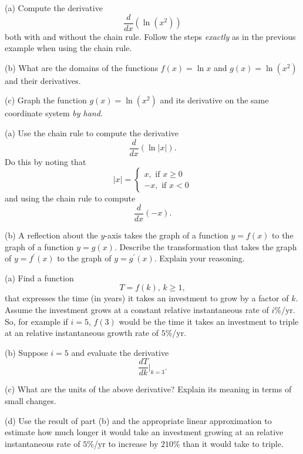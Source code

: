 \documentclass{ximera}
\begin{document}
\begin{question}  \label{Qdfbb44443243}
(a) Compute the derivative 
\[
       \frac{d}{dx} \left( \ln(x^2)  \right)
\]
both with and without the chain rule. Follow the steps \emph{exactly} as in the previous example when using the chain rule.

(b) What are the domains of the functions $f(x)=\ln x$ and $g(x) = \ln (x^2)$ and their derivatives.

(c) Graph the function $g(x) = \ln (x^2)$ and its derivative on the same coordinate system \emph{by hand}.

\end{question}

\begin{question}  \label{Qdefrgbhrdtgr}
(a) Use the chain rule to compute the derivative
\[
   \frac{d}{dx} \left( \ln |x| \right) .
\]
Do this by noting that
\[
|x| = 
\begin{cases}
    x , \text{ if } x\geq 0 \\
   -x ,  \text{ if } x<0
\end{cases}
\]
and using the chain rule to compute 
\[
  \frac{d}{dx}  \left(  -x \right).
\]

(b) A reflection about the $y$-axis takes the graph of a function $y=f(x)$ to the graph of a function $y=g(x)$. Describe the transformation that takes the graph of $y=f^\prime(x)$ to the graph of $y=g^\prime(x)$. Explain your reasoning.

\end{question}

\begin{question} \label{Qmf4566544}
(a) Find a function
\[
      T = f(k) , \, k\geq 1,
\]
that expresses the time (in years) it takes an investment to grow by a factor of $k$. Assume the investment grows at a constant relative instantaneous rate of $i\%$/yr. So, for example if $i=5$, $f(3)$ would be the time it takes an investment to triple at an relative instantaneous growth rate of $5\%$/yr.

(b) Suppose $i=5$ and evaluate the derivative
\[
    \frac{dT}{dk} \Big|_{k=3} .
\]

(c) What are the units of the above derivative? Explain its meaning in terms of small changes.

(d) Use the result of part (b) and the appropriate linear approximation to estimate how much longer it would take an investment growing at an relative instantaneous rate of $5\%$/yr to increase by $210\%$ than it would take to triple.
\end{question}
\end{document}
